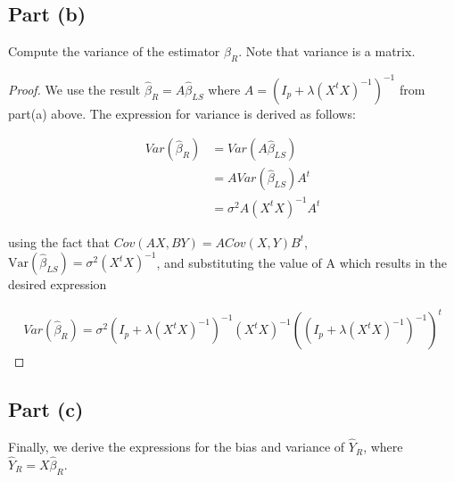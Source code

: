 \documentclass[paper=a4, fontsize=11pt]{scrartcl} %
\numberwithin{equation}{section} %
\begin{document}
\subsection*{Part (b)}

Compute the variance of the estimator $\hat{\beta}_R$. Note that variance is a matrix.

\begin{proof}

We use the result $\hat{\beta}_R = A \hat{\beta}_{LS}$ where $A = (I_p + \lambda(X^t X)^{-1})^{-1}$ from part(a) above. The expression for variance is derived as follows:

\begin{align}
Var(\hat{\beta}_R) &= Var(A \hat{\beta}_{LS}) \\
&= A Var(\hat{\beta}_{LS}) A^t \\
&= \sigma^2 A (X^t X)^{-1} A^t
\end{align}

using the fact that $Cov(AX, BY) = A Cov(X, Y) B^t$, $ \text{Var}(\hat{\beta}_{LS}) = \sigma^2 (X^t X)^{-1}$, and substituting the value of A which results in the desired expression 

\begin{align}
Var(\hat{\beta}_R) = \sigma^2 (I_p + \lambda(X^t X)^{-1})^{-1} (X^t X)^{-1} ((I_p + \lambda(X^t X)^{-1})^{-1})^t
\end{align}

\end{proof}

\subsection*{Part (c)}

Finally, we derive the expressions for the bias and variance of $\hat{Y}_R$, where $\hat{Y}_R = X \hat{\beta}_R$.
\end{document}
